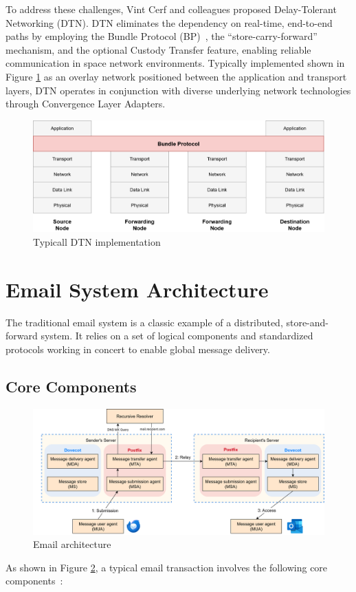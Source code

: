 To address these challenges, Vint Cerf and colleagues proposed Delay-Tolerant Networking (DTN). DTN eliminates the dependency on real-time, end-to-end paths by employing the Bundle Protocol (BP)~\cite{rfc9171}, the ``store-carry-forward'' mechanism, and the optional Custody Transfer feature, enabling reliable communication in space network environments. Typically implemented shown in Figure \ref{Typicall_DTN_implementation} as an overlay network positioned between the application and transport layers, DTN operates in conjunction with diverse underlying network technologies through Convergence Layer Adapters.
\begin{figure}[h]
    \centering
    \includegraphics[width=\linewidth]{Literature Review/Typicall_DTN_implementation.png}
    \caption{Typicall DTN implementation}
    \label{Typicall_DTN_implementation}
\end{figure}

\section{Email System Architecture}

The traditional email system is a classic example of a distributed, store-and-forward system. It relies on a set of logical components and standardized protocols working in concert to enable global message delivery.

\subsection{Core Components}

\begin{figure}[h]
    \centering
    \includegraphics[width=\linewidth]{Literature Review/Email_architecture.png}
    \caption{Email architecture}
    \label{Email_architecture}
\end{figure}
As shown in Figure \ref{Email_architecture}, a typical email transaction involves the following core components~\cite{rfc5598}:

